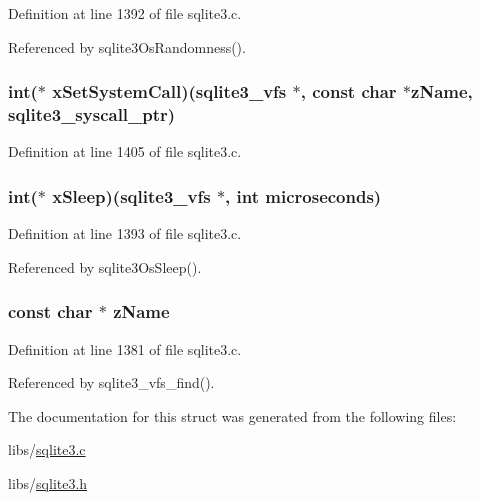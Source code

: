 Definition at line 1392 of file sqlite3.\+c.



Referenced by sqlite3\+Os\+Randomness().

\hypertarget{structsqlite3__vfs_a2f4a2d9488914d188408748b119533d7}{}
\subsubsection[{x\+Set\+System\+Call}]{\setlength{\rightskip}{0pt plus 5cm}int($\ast$ x\+Set\+System\+Call)({\bf sqlite3\+\_\+vfs} $\ast$, const char $\ast${\bf z\+Name}, {\bf sqlite3\+\_\+syscall\+\_\+ptr})}\label{structsqlite3__vfs_a2f4a2d9488914d188408748b119533d7}


Definition at line 1405 of file sqlite3.\+c.

\hypertarget{structsqlite3__vfs_a78dd047fb761ec85fb58582ba98b8bf9}{}
\subsubsection[{x\+Sleep}]{\setlength{\rightskip}{0pt plus 5cm}int($\ast$ x\+Sleep)({\bf sqlite3\+\_\+vfs} $\ast$, int microseconds)}\label{structsqlite3__vfs_a78dd047fb761ec85fb58582ba98b8bf9}


Definition at line 1393 of file sqlite3.\+c.



Referenced by sqlite3\+Os\+Sleep().

\hypertarget{structsqlite3__vfs_a58125535bc4b42100276f9f3390ffae0}{}
\subsubsection[{z\+Name}]{\setlength{\rightskip}{0pt plus 5cm}const char $\ast$ z\+Name}\label{structsqlite3__vfs_a58125535bc4b42100276f9f3390ffae0}


Definition at line 1381 of file sqlite3.\+c.



Referenced by sqlite3\+\_\+vfs\+\_\+find().



The documentation for this struct was generated from the following files\+:\begin{DoxyCompactItemize}
\item 
libs/\hyperlink{sqlite3_8c}{sqlite3.\+c}\item 
libs/\hyperlink{sqlite3_8h}{sqlite3.\+h}\end{DoxyCompactItemize}
